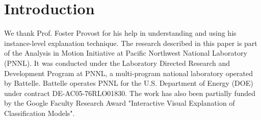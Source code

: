 






% 

\section{Introduction}











We thank Prof. Foster Provost for his help in understanding and using his instance-level explanation technique. The research described in this paper is part of the Analysis in Motion Initiative at Pacific Northwest National Laboratory (PNNL). It was conducted under the Laboratory Directed Research and Development Program at PNNL, a multi-program national laboratory operated by Battelle. Battelle operates PNNL for the U.S. Department of Energy (DOE) under contract DE-AC05-76RLO01830. The work has also been partially funded by the Google Faculty Research Award "Interactive Visual Explanation of Classification Models".

% 
% 
%
%
%

% 
% 
